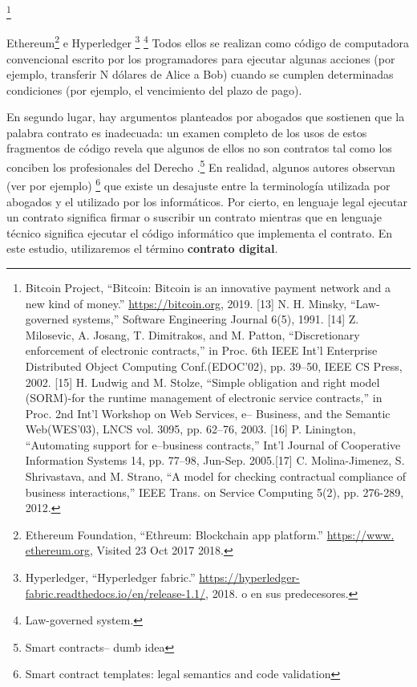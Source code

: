 \documentclass[12pt]{report} %
\begin{document}
\begin{itemize}
\footnote{Bitcoin Project, “Bitcoin:
Bitcoin is an innovative payment network and a new kind of money.” \url{https://bitcoin.org}, 2019.  [13] N. H. Minsky, “Law-governed systems,” 
Software Engineering Journal 6(5), 1991. [14] Z. Milosevic, A. Josang, T. Dimitrakos, and M. Patton, “Discretionary enforcement of electronic contracts,” in Proc. 6th IEEE Int’l Enterprise Distributed Object Computing Conf.(EDOC’02), pp. 39–50, IEEE CS Press, 2002. [15] H. Ludwig and M. Stolze, “Simple obligation and right model (SORM)-for the runtime management of electronic service contracts,” in Proc. 2nd Int’l Workshop on Web Services, e–
Business, and the Semantic Web(WES’03), 
LNCS vol. 3095, pp. 62–76, 2003. [16] P. Linington, “Automating support for e–business contracts,” Int’l 
Journal of Cooperative Information Systems 14, pp. 77–98, Jun-Sep. 2005.[17] C. Molina-Jimenez, S. Shrivastava, and M. Strano, “A model for checking contractual compliance of business interactions,” IEEE Trans. on Service Computing 5(2), pp. 276-289, 2012.}
 


Ethereum\footnote{Ethereum Foundation, “Ethreum: Blockchain app platform.” \url{https://www. ethereum.org}, Visited 23 Oct 2017 2018.}  e Hyperledger \footnote{Hyperledger, “Hyperledger fabric.” \url{https://hyperledger-fabric.readthedocs.io/en/release-1.1/}, 2018.  o en sus predecesores.} \footnote{\cite{Minsky1991}Law-governed system.}
Todos ellos se realizan como código de computadora convencional escrito por los programadores para ejecutar algunas acciones (por ejemplo, transferir N dólares de Alice a Bob) cuando se cumplen determinadas condiciones (por ejemplo, el vencimiento del plazo de pago).

En segundo lugar, hay argumentos planteados por abogados que sostienen que la palabra contrato es inadecuada: un examen completo de los usos de estos fragmentos de código revela que algunos de ellos no son contratos tal como los conciben los profesionales del Derecho .\footnote{\cite{Kieron2017}Smart contracts– dumb idea} En realidad, algunos autores observan (ver por ejemplo) \footnote{\cite{Christopher2019} Smart contract templates: legal semantics and code validation} que existe un desajuste entre la terminología utilizada por abogados y el utilizado por los informáticos. Por cierto, en lenguaje legal ejecutar un contrato significa firmar o suscribir un contrato mientras que en lenguaje técnico significa ejecutar el código informático que implementa el contrato. En este estudio, utilizaremos el término \textbf{contrato digital}.


\end{itemize}
\end{document}

